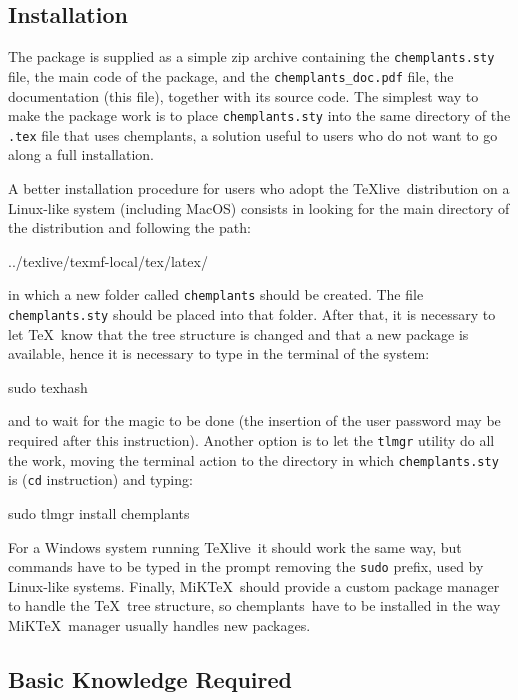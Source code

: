 \documentclass[12pt]{article}						%
\newcommand*{\chemplants}{chemplants}
\newcommand*{\TeXlive}{\TeX live}
\newcommand*{\MiKTeX}{MiK\TeX}
\begin{document}
\subsection{Installation}

The package is supplied as a simple zip archive containing the
\verb|chemplants.sty| file, the main code of the package, and the
\verb|chemplants_doc.pdf| file, the documentation (this file), together with its
source code. The simplest way to make the package work is to place
\verb|chemplants.sty| into the same directory of the \verb|.tex| file that uses
\chemplants, a solution useful to users who do not want to go along a full
installation.

A better installation procedure for users who adopt the \TeXlive\ distribution
on a Linux-like system (including MacOS) consists in looking for the main
directory of the distribution and following the path:
\begin{chpcode}
	../texlive/texmf-local/tex/latex/
\end{chpcode}
in which a new folder called \verb|chemplants| should be created. The file
\verb|chemplants.sty| should be placed into that folder. After that, it is
necessary to let \TeX\ know that the tree structure is changed and that a new
package is available, hence it is necessary to type in the terminal of the
system:
\begin{chpcode}
	sudo texhash
\end{chpcode}
and to wait for the magic to be done (the insertion of the user password may be
required after this instruction). Another option is to let the \verb|tlmgr|
utility do all the work, moving the terminal action to the directory in which
\verb|chemplants.sty| is (\verb|cd| instruction) and typing:
\begin{chpcode}
	sudo tlmgr install chemplants
\end{chpcode}

For a Windows system running \TeXlive\ it should work the same way, but commands
have to be typed in the prompt removing the \verb|sudo| prefix, used by
Linux-like systems. Finally, \MiKTeX\ should provide a custom package manager to
handle the \TeX\ tree structure, so \chemplants\ have to be installed in the way
\MiKTeX\ manager usually handles new packages.

\subsection{Basic Knowledge Required}
\end{document}
